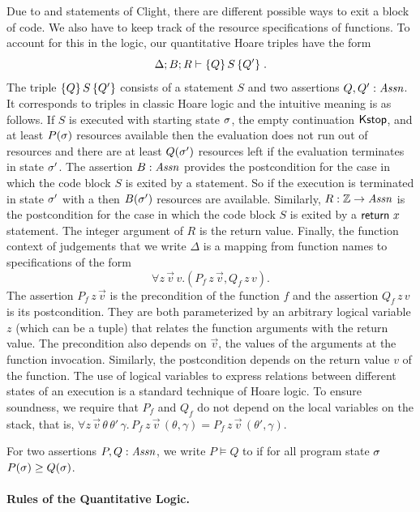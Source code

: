 \documentclass[nocopyrightspace,preprint,pldi]{sigplanconf-pldi15}
\begin{document}
{Due to  and  statements of Clight, there are
different possible ways to exit a block of code.  We also have to keep
track of the resource specifications of functions.  To account for
this in the logic, our quantitative Hoare triples have the form
$$
\Delta; B; R \vdash
\{ Q \}\,  S \, \{ Q' \} \; .
$$
The triple $\{ Q \}\,  S \, \{ Q' \}$ consists of a statement $S$ and
two assertions $Q,Q' : \mathit{Assn}$.  It corresponds to triples in classic
Hoare logic and the intuitive meaning is as follows.  If $S$ is
executed with starting state $\sigma$, the empty continuation
$\mathsf{Kstop}$, and at least $P(\sigma)$ resources available then the
evaluation does not run out of resources and there are at least
$Q(\sigma')$ resources left if the evaluation terminates in state
$\sigma'$.  The assertion $B : \mathit{Assn}$ provides the
postcondition for the case in which the code block $S$ is exited by a
 statement.  So if the execution is terminated in state
$\sigma'$ with a  then $B(\sigma')$ resources are
available.  Similarly, $R : \mathbb{Z} \to \mathit{Assn}$ is the postcondition for the
case in which the code block $S$ is exited by a $\mathsf{return}~x$
statement.  The integer argument of $R$ is the return value.
Finally, the function context of judgements that we write $\Delta$ is
a mapping from function names to specifications of the form
$$
  \forall z \, \vec v \, v .(P_f \, z \, \vec v, Q_f \, z \, v).
$$
The assertion $P_f \, z \, \vec v$ is the precondition of the function
$f$ and the assertion $Q_f \, z \, v$ is its postcondition.  They are
both parameterized by an arbitrary logical variable $z$ (which can be a
tuple) that relates the function arguments with the return value.  The
precondition also depends on $\vec v$, the values of the arguments
at the function invocation.  Similarly, the postcondition depends on
the return value $v$ of the function.  The use of logical variables to
express relations between different states of an execution is a
standard technique of Hoare logic.
%
To ensure soundness, we require that $P_f$ and $Q_f$ do not depend on
the local variables on the stack, that is, $\forall z \, \vec v
\, \theta \, \theta' \, \gamma . \, P_f \, z \, \vec v \,
(\theta,\gamma) = P_f \, z \, \vec v \, (\theta',\gamma)$.

For two assertions $P,Q : \mathit{Assn}$, we write $P \models Q$ to if for all
program state $\sigma$ $P(\sigma) \ge Q(\sigma)$.

\paragraph{Rules of the Quantitative Logic.}

}
\end{document}
